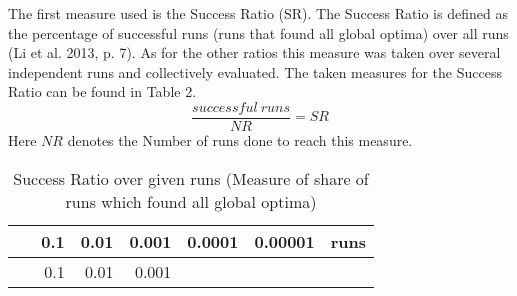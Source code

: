 \documentclass[12pt,a4paper]{article}
\begin{document}
The first measure used is the Success Ratio (SR). The Success Ratio is
defined as the percentage of successful runs (runs that found all global
optima) over all runs (Li et al. 2013, p. 7). As for the other ratios
this measure was taken over several independent runs and collectively
evaluated. The taken measures for the Success Ratio can be found in
Table 2. \[\frac{successful\ runs}{NR} = SR \] Here \(NR\) denotes the
Number of runs done to reach this measure. \newline

\begin{longtable}[c]{@{}crrrrrr@{}}
\caption{Success Ratio over given runs (Measure of share of runs which
found all global optima)}\tabularnewline
\toprule
\begin{minipage}[b]{0.11\columnwidth}\centering\strut
~
\strut\end{minipage} &
\begin{minipage}[b]{0.07\columnwidth}\raggedleft\strut
0.1
\strut\end{minipage} &
\begin{minipage}[b]{0.08\columnwidth}\raggedleft\strut
0.01
\strut\end{minipage} &
\begin{minipage}[b]{0.09\columnwidth}\raggedleft\strut
0.001
\strut\end{minipage} &
\begin{minipage}[b]{0.10\columnwidth}\raggedleft\strut
0.0001
\strut\end{minipage} &
\begin{minipage}[b]{0.11\columnwidth}\raggedleft\strut
0.00001
\strut\end{minipage} &
\begin{minipage}[b]{0.07\columnwidth}\raggedleft\strut
runs
\strut\end{minipage}\tabularnewline
\midrule
\endfirsthead
\toprule
\begin{minipage}[b]{0.11\columnwidth}\centering\strut
~
\strut\end{minipage} &
\begin{minipage}[b]{0.07\columnwidth}\raggedleft\strut
0.1
\strut\end{minipage} &
\begin{minipage}[b]{0.08\columnwidth}\raggedleft\strut
0.01
\strut\end{minipage} &
\begin{minipage}[b]{0.09\columnwidth}\raggedleft\strut
0.001
\strut\end{minipage} &
\begin{minipage}[b]{0.10\columnwidth}\raggedleft\strut

\end{minipage}
\end{longtable}
\end{document}
